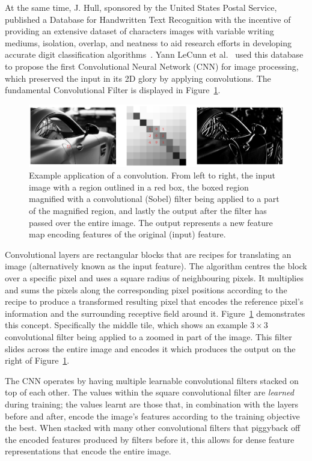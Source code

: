\documentclass[11pt,twoside]{report}
\begin{document}
At the same time, J. Hull, sponsored by the United States Postal Service, published a Database for Handwritten Text Recognition with the incentive of providing an extensive dataset of characters images with variable writing mediums, isolation, overlap, and neatness to aid research efforts in developing accurate digit classification algorithms~\cite{JJHull1994}. Yann LeCunn et al.~\cite{Lenet1998} used this database to propose the first Convolutional Neural Network (CNN) for image processing, which preserved the input in its 2D glory by applying convolutions. The fundamental Convolutional Filter is displayed in Figure~\ref{fig:sobel}.

\begin{figure}[H]
  \centering
  \includegraphics[width=1\linewidth]{../figures/sobel.png}
  \caption{Example application of a convolution. From left to right, the input image with a region outlined in a red box, the boxed region magnified with a convolutional (Sobel) filter being applied to a part of the magnified region, and lastly the output after the filter has passed over the entire image. The output represents a new feature map encoding features of the original (input) feature.}\label{fig:sobel}
\end{figure}

Convolutional layers are rectangular blocks that are recipes for translating an image (alternatively known as the input feature). The algorithm centres the block over a specific pixel and uses a square radius of neighbouring pixels. It multiplies and sums the pixels along the corresponding pixel positions according to the recipe to produce a transformed resulting pixel that encodes the reference pixel's information and the surrounding receptive field around it. Figure~\ref{fig:sobel} demonstrates this concept. Specifically the middle tile, which shows an example $3 \times 3$ convolutional filter being applied to a zoomed in part of the image. This filter slides across the entire image and encodes it which produces the output on the right of Figure~\ref{fig:sobel}. 

The CNN operates by having multiple learnable convolutional filters stacked on top of each other. The values within the square convolutional filter are \textit{learned} during training; the values learnt are those that, in combination with the layers before and after, encode the image's features according to the training objective the best. When stacked with many other convolutional filters that piggyback off the encoded features produced by filters before it, this allows for dense feature representations that encode the entire image.
\end{document}
